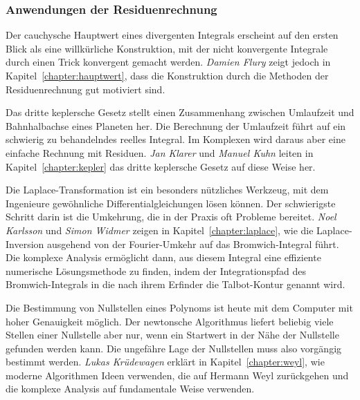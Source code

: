 %
%
\subsubsection{Anwendungen der Residuenrechnung}

%
%
Der cauchysche Hauptwert eines divergenten Integrals erscheint auf den
ersten Blick als eine willkürliche Konstruktion, mit der nicht konvergente
Integrale durch einen Trick konvergent gemacht werden.
\emph{Damien Flury}
%
%
zeigt jedoch in Kapitel~\ref{chapter:hauptwert}, dass die Konstruktion
durch die Methoden der Residuenrechnung gut motiviert sind.

%
%
Das dritte keplersche Gesetz stellt einen Zusammenhang zwischen Umlaufzeit
und Bahnhalbachse eines Planeten her.
Die Berechnung der Umlaufzeit führt auf ein schwierig zu behandelndes
reelles Integral.
Im Komplexen wird daraus aber eine einfache Rechnung mit Residuen.
\emph{Jan Klarer}
%
%
und
\emph{Manuel Kuhn}
%
%
leiten in Kapitel~\ref{chapter:kepler} das dritte keplersche Gesetz auf
diese Weise her.

%
%
Die Laplace-Transformation ist ein besonders nützliches Werkzeug, mit dem
Ingenieure gewöhnliche Differentialgleichungen lösen können.
Der schwierigste Schritt darin ist die Umkehrung, die in der Praxis oft
Probleme bereitet. 
\emph{Noel Karlsson}
%
%
und
\emph{Simon Widmer}
%
%
zeigen in Kapitel~\ref{chapter:laplace}, wie die Laplace-Inversion
ausgehend von der Fourier-Umkehr auf das
%
Bromwich-Integral führt.
Die komplexe Analysis ermöglicht dann, aus diesem Integral eine effiziente
numerische Lösungsmethode zu finden, indem der Integrationspfad des
Bromwich-Integrals in die nach ihrem Erfinder die Talbot-Kontur genannt wird.
%
%

%
%
Die Bestimmung von Nullstellen eines Polynoms ist heute mit dem Computer
mit hoher Genauigkeit möglich.
Der newtonsche Algorithmus liefert beliebig viele Stellen einer Nullstelle
aber nur, wenn ein Startwert in der Nähe der Nullstelle gefunden werden kann.
Die ungefähre Lage der Nullstellen muss also vorgängig bestimmt werden.
\emph{Lukas Krüdewagen}
%
%
erklärt in Kapitel~\ref{chapter:weyl}, wie moderne Algorithmen Ideen
verwenden, die auf Hermann Weyl zurückgehen und die komplexe Analysis
auf fundamentale Weise verwenden.


